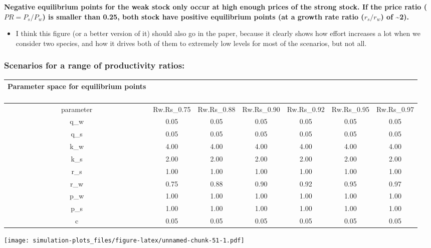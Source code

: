 \documentclass[
]{article}
\providecommand{\tightlist}{%
  \setlength{\itemsep}{0pt}\setlength{\parskip}{0pt}}
\begin{document}
\textbf{Negative equilibrium points for the weak stock only occur at
high enough prices of the strong stock. If the price ratio
(\(PR = P_s/P_w\)) is smaller than 0.25, both stock have positive
equilibrium points (at a growth rate ratio (\(r_s/r_w\)) of
\textasciitilde2).}

\begin{itemize}
\tightlist
\item
  I think this figure (or a better version of it) should also go in the
  paper, because it clearly shows how effort increases a lot when we
  consider two species, and how it drives both of them to extremely low
  levels for most of the scenarios, but not all.
\end{itemize}

\hypertarget{scenarios-for-a-range-of-productivity-ratios}{%
\subsubsection{Scenarios for a range of productivity
ratios:}\label{scenarios-for-a-range-of-productivity-ratios}}

\captionsetup[table]{labelformat=empty,skip=1pt}
\begin{longtable}{ccccccc}
\caption*{
\large Parameter space for equilibrium points\\ 
\small \\ 
} \\ 
\toprule
parameter & Rw.Rs\_0.75 & Rw.Rs\_0.88 & Rw.Rs\_0.90 & Rw.Rs\_0.92 & Rw.Rs\_0.95 & Rw.Rs\_0.97 \\ 
\midrule
q\_w & 0.05 & 0.05 & 0.05 & 0.05 & 0.05 & 0.05 \\ 
q\_s & 0.05 & 0.05 & 0.05 & 0.05 & 0.05 & 0.05 \\ 
k\_w & 4.00 & 4.00 & 4.00 & 4.00 & 4.00 & 4.00 \\ 
k\_s & 2.00 & 2.00 & 2.00 & 2.00 & 2.00 & 2.00 \\ 
r\_s & 1.00 & 1.00 & 1.00 & 1.00 & 1.00 & 1.00 \\ 
r\_w & 0.75 & 0.88 & 0.90 & 0.92 & 0.95 & 0.97 \\ 
p\_w & 1.00 & 1.00 & 1.00 & 1.00 & 1.00 & 1.00 \\ 
p\_s & 1.00 & 1.00 & 1.00 & 1.00 & 1.00 & 1.00 \\ 
c & 0.05 & 0.05 & 0.05 & 0.05 & 0.05 & 0.05 \\ 
\bottomrule
\end{longtable}

\texttt{[image: simulation-plots\_files/figure-latex/unnamed-chunk-51-1.pdf]}
\end{document}
